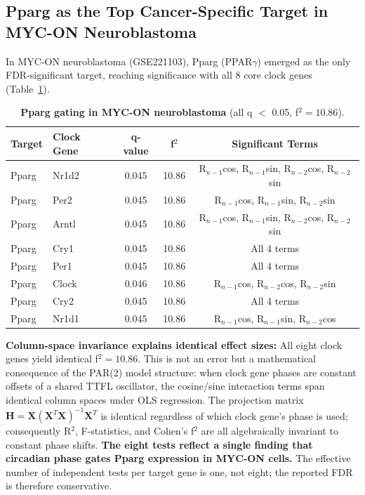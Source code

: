 \documentclass[11pt,letterpaper]{article}
\begin{document}
\subsection{Pparg as the Top Cancer-Specific Target in MYC-ON Neuroblastoma}

In MYC-ON neuroblastoma (GSE221103), Pparg (PPAR$\gamma$) emerged as the only FDR-significant target, reaching significance with all 8 core clock genes (Table~\ref{tab:pparg}).

\begin{table}[H]
\centering
\caption{\textbf{Pparg gating in MYC-ON neuroblastoma} (all q $<$ 0.05, f$^2 = 10.86$).}
\label{tab:pparg}
\begin{tabular}{llccc}
\toprule
Target & Clock Gene & q-value & f$^2$ & Significant Terms \\
\midrule
Pparg & Nr1d2 & 0.045 & 10.86 & R$_{n-1}$cos, R$_{n-1}$sin, R$_{n-2}$cos, R$_{n-2}$sin \\
Pparg & Per2 & 0.045 & 10.86 & R$_{n-1}$cos, R$_{n-1}$sin, R$_{n-2}$sin \\
Pparg & Arntl & 0.045 & 10.86 & R$_{n-1}$cos, R$_{n-1}$sin, R$_{n-2}$cos, R$_{n-2}$sin \\
Pparg & Cry1 & 0.045 & 10.86 & All 4 terms \\
Pparg & Per1 & 0.045 & 10.86 & All 4 terms \\
Pparg & Clock & 0.046 & 10.86 & R$_{n-1}$cos, R$_{n-2}$cos, R$_{n-2}$sin \\
Pparg & Cry2 & 0.045 & 10.86 & All 4 terms \\
Pparg & Nr1d1 & 0.045 & 10.86 & R$_{n-1}$cos, R$_{n-1}$sin, R$_{n-2}$cos \\
\bottomrule
\end{tabular}
\end{table}

\textbf{Column-space invariance explains identical effect sizes:} All eight clock genes yield identical f$^2 = 10.86$. This is not an error but a mathematical consequence of the PAR(2) model structure: when clock gene phases are constant offsets of a shared TTFL oscillator, the cosine/sine interaction terms span identical column spaces under OLS regression. The projection matrix $\mathbf{H} = \mathbf{X}(\mathbf{X}^T\mathbf{X})^{-1}\mathbf{X}^T$ is identical regardless of which clock gene's phase is used; consequently R$^2$, F-statistics, and Cohen's f$^2$ are all algebraically invariant to constant phase shifts. \textbf{The eight tests reflect a single finding that circadian phase gates Pparg expression in MYC-ON cells.} The effective number of independent tests per target gene is one, not eight; the reported FDR is therefore conservative.
\end{document}
